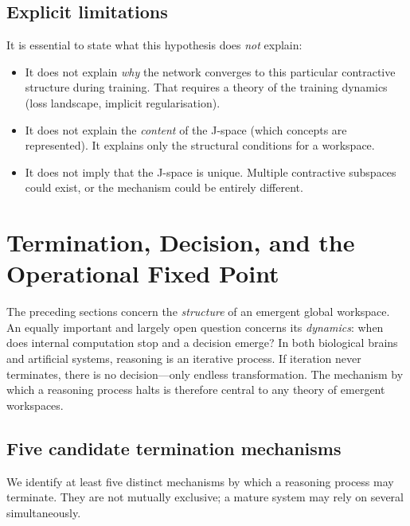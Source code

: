 \documentclass[11pt,a4paper]{article}
\theoremstyle{definition}
\begin{document}
\subsection{Explicit limitations}

It is essential to state what this hypothesis does \emph{not} explain:
\begin{itemize}
    \item It does not explain \emph{why} the network converges to this particular
    contractive structure during training. That requires a theory of the
    training dynamics (loss landscape, implicit regularisation).
    \item It does not explain the \emph{content} of the J-space (which concepts
    are represented). It explains only the structural conditions for a workspace.
    \item It does not imply that the J-space is unique. Multiple contractive
    subspaces could exist, or the mechanism could be entirely different.
\end{itemize}

\section{Termination, Decision, and the Operational Fixed Point}
\label{sec:termination}

The preceding sections concern the \emph{structure} of an emergent global workspace.
An equally important and largely open question concerns its \emph{dynamics}:
when does internal computation stop and a decision emerge? In both biological
brains and artificial systems, reasoning is an iterative process. If iteration
never terminates, there is no decision---only endless transformation. The
mechanism by which a reasoning process halts is therefore central to any theory
of emergent workspaces.

\subsection{Five candidate termination mechanisms}

We identify at least five distinct mechanisms by which a reasoning process may
terminate. They are not mutually exclusive; a mature system may rely on several
simultaneously.
\end{document}
